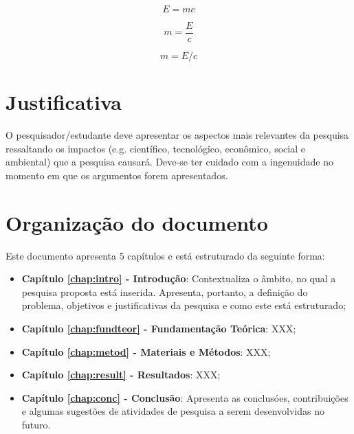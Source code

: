 \begin{equation}
  E=mc
\end{equation}


\begin{equation*}
  m=\frac{E}{c}
\end{equation*}

\begin{equation}
  m=E/c
\end{equation}


\section{Justificativa}
\label{sec:justi}

O pesquisador/estudante deve apresentar os aspectos mais
relevantes da pesquisa ressaltando os impactos (e.g. cient\'ifico,
tecnol\'ogico, econ\^omico, social e ambiental) que a pesquisa
causar\'a. Deve-se ter cuidado com a ingenuidade no momento em que
os argumentos forem apresentados.




\section{Organização do documento}
\label{section:organizacao}

Este documento apresenta $5$ capítulos e está estruturado da seguinte forma:

\begin{itemize}

  \item \textbf{Capítulo \ref{chap:intro} - Introdução}: Contextualiza o âmbito, no qual a pesquisa proposta está inserida. Apresenta, portanto, a definição do problema, objetivos e justificativas da pesquisa e como este \thetypeworkthree está estruturado;
  \item \textbf{Capítulo \ref{chap:fundteor} - Fundamentação Teórica}: XXX;
  \item \textbf{Capítulo \ref{chap:metod} - Materiais e Métodos}: XXX;
  \item \textbf{Capítulo \ref{chap:result} - Resultados}: XXX;
  \item \textbf{Capítulo \ref{chap:conc} - Conclusão}: Apresenta as conclusóes, contribuições e algumas sugestões de atividades de pesquisa a serem desenvolvidas no futuro.

\end{itemize}
